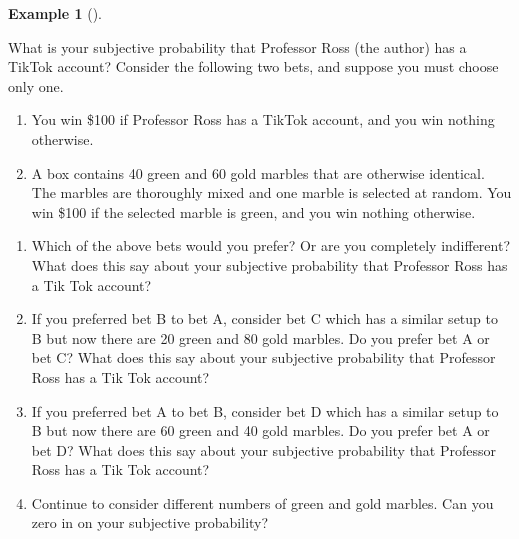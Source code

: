 \documentclass[
  letterpaper,
  DIV=11,
  numbers=noendperiod]{scrreprt}
\providecommand{\tightlist}{%
  \setlength{\itemsep}{0pt}\setlength{\parskip}{0pt}}
\theoremstyle{plain}
\theoremstyle{definition}
\newtheorem{example}{Example}[chapter]
\theoremstyle{definition}
\theoremstyle{definition}
\theoremstyle{remark}
\begin{document}
\begin{tcolorbox}[enhanced jigsaw, opacityback=0, left=2mm, colframe=quarto-callout-note-color-frame, toprule=.15mm, breakable, colback=white, leftrule=.75mm, arc=.35mm, rightrule=.15mm, bottomrule=.15mm]

\begin{example}[]\protect\hypertarget{exm-subjective-bet}{}\label{exm-subjective-bet}

What is your subjective probability that Professor Ross (the author) has
a TikTok account? Consider the following two bets, and suppose you must
choose only one.

\begin{enumerate}
\def\labelenumi{\Alph{enumi})}
\tightlist
\item
  You win \$100 if Professor Ross has a TikTok account, and you win
  nothing otherwise.
\item
  A box contains 40 green and 60 gold marbles that are otherwise
  identical. The marbles are thoroughly mixed and one marble is selected
  at random. You win \$100 if the selected marble is green, and you win
  nothing otherwise.
\end{enumerate}

\begin{enumerate}
\def\labelenumi{\arabic{enumi}.}
\tightlist
\item
  Which of the above bets would you prefer? Or are you completely
  indifferent? What does this say about your subjective probability that
  Professor Ross has a Tik Tok account?
\item
  If you preferred bet B to bet A, consider bet C which has a similar
  setup to B but now there are 20 green and 80 gold marbles. Do you
  prefer bet A or bet C? What does this say about your subjective
  probability that Professor Ross has a Tik Tok account?
\item
  If you preferred bet A to bet B, consider bet D which has a similar
  setup to B but now there are 60 green and 40 gold marbles. Do you
  prefer bet A or bet D? What does this say about your subjective
  probability that Professor Ross has a Tik Tok account?
\item
  Continue to consider different numbers of green and gold marbles. Can
  you zero in on your subjective probability?
\end{enumerate}

\end{example}

\end{tcolorbox}
\end{document}
